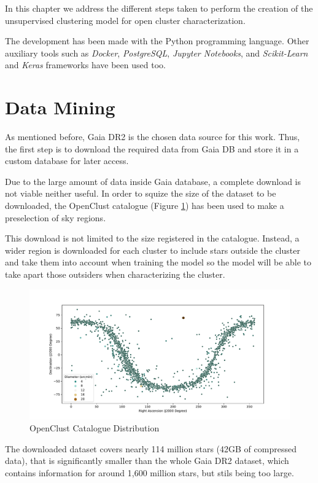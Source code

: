 \documentclass[11pt, a4paper, english]{book}
\begin{document}
In this chapter we address the different steps taken to perform the creation of the unsupervised clustering model for open cluster characterization.

The development has been made with the Python programming language. Other auxiliary tools such as \emph{Docker}, \emph{PostgreSQL}, \emph{Jupyter Notebooks},
and \emph{Scikit-Learn} and \emph{Keras} frameworks have been used too.

\section{Data Mining}

As mentioned before, Gaia DR2 is the chosen data source for this work. Thus, the first step is to download the required data from Gaia DB
and store it in a custom database for later access.

Due to the large amount of data inside Gaia database, a complete download is not viable neither useful.
In order to squize the size of the dataset to be downloaded, the OpenClust catalogue \cite{dias2002new} (Figure \ref{fig:OpenClustComplete})
has been used to make a preselection of sky regions.

This download is not limited to the size registered in the catalogue. Instead, a wider region is downloaded for each cluster to include
stars outside the cluster and take them into account when training the model so the model will be able to take apart those outsiders
when characterizing the cluster.

\begin{figure}[htbp]
  \centering
  \includegraphics[width=\columnwidth]{../figures/openclust_catalogue.pdf}
  \caption{OpenClust Catalogue Distribution}
  \label{fig:OpenClustComplete}
\end{figure}

The downloaded dataset covers nearly 114 million stars (42GB of compressed data), that is significantly smaller than the whole Gaia DR2 dataset, which contains
information for around 1,600 million stars, but stils being too large.
\end{document}
